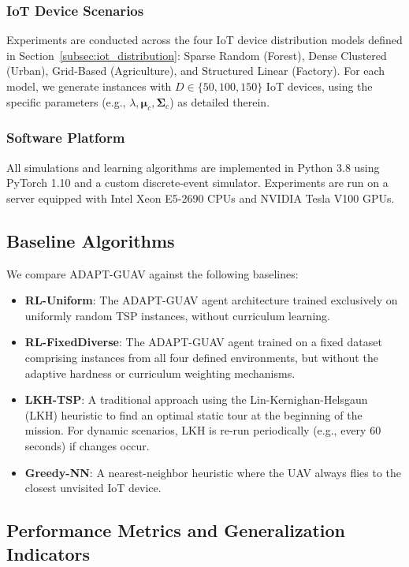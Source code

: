 \documentclass[10pt,conference,letterpaper]{IEEEtran}
\begin{document}
\subsubsection{IoT Device Scenarios}
Experiments are conducted across the four IoT device distribution models defined in Section~\ref{subsec:iot_distribution}: Sparse Random (Forest), Dense Clustered (Urban), Grid-Based (Agriculture), and Structured Linear (Factory). For each model, we generate instances with $D \in \{50, 100, 150\}$ IoT devices, using the specific parameters (e.g., $\lambda, \mathbf{\mu}_c, \mathbf{\Sigma}_c$) as detailed therein.

\subsubsection{Software Platform}
All simulations and learning algorithms are implemented in Python 3.8 using PyTorch 1.10 and a custom discrete-event simulator. Experiments are run on a server equipped with Intel Xeon E5-2690 CPUs and NVIDIA Tesla V100 GPUs.

\subsection{Baseline Algorithms}
\label{subsec:baselines}
We compare ADAPT-GUAV against the following baselines:
\begin{itemize}
    \item \textbf{RL-Uniform}: The ADAPT-GUAV agent architecture trained exclusively on uniformly random TSP instances, without curriculum learning.
    \item \textbf{RL-FixedDiverse}: The ADAPT-GUAV agent trained on a fixed dataset comprising instances from all four defined environments, but without the adaptive hardness or curriculum weighting mechanisms.
    \item \textbf{LKH-TSP}: A traditional approach using the Lin-Kernighan-Helsgaun (LKH) heuristic to find an optimal static tour at the beginning of the mission. For dynamic scenarios, LKH is re-run periodically (e.g., every 60 seconds) if changes occur.
    \item \textbf{Greedy-NN}: A nearest-neighbor heuristic where the UAV always flies to the closest unvisited IoT device.
\end{itemize}

\subsection{Performance Metrics and Generalization Indicators}
\label{subsec:exp_metrics}
\end{document}
